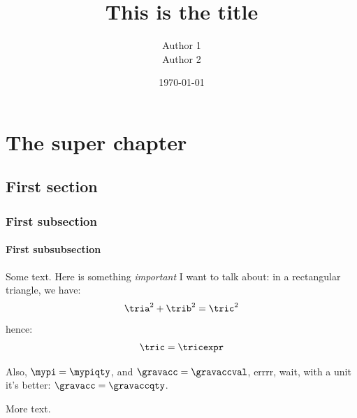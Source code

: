 \documentclass[a4paper]{report}
\title{This is the title}
\author{Author 1 \\ Author 2}
\date{\today}
\newcommand{\highlight}[1]{%
    {\color{lblue}\itshape #1}%
}
\begin{document}

\tableofcontents

\makenotationindex

\chapter[Short chapter]{The super chapter}
\section{First section}
\subsection{First subsection}
\subsubsection{First subsubsection}

Some text. Here is something \highlight{important} I want to talk about: in a rectangular triangle, we have:
\begin{equation}
    \tria^2 + \trib^2 = \tric^2
\end{equation}
hence:
\begin{equation}
    \tric = \tricexpr
\end{equation}

Also, $\mypi = \mypiqty$, and $\gravacc = \gravaccval$, 
errrr, wait, with a unit it's better: $\gravacc = \gravaccqty$.

\newpage
More text.
\end{document}
